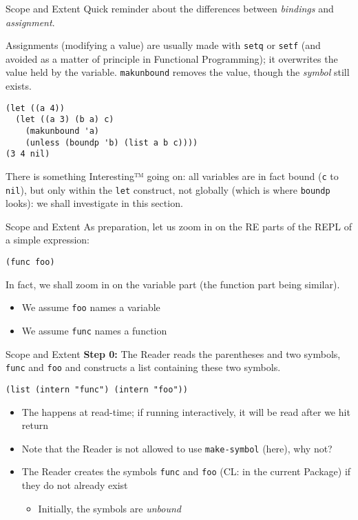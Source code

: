 \documentclass[presentation]{beamer}
\begin{document}
\begin{frame}[fragile]{Scope and Extent}
  Quick reminder about the differences between \emph{bindings} and \emph{assignment}.

  \medskip
  Assignments (modifying a value) are usually made with \texttt{setq} or \texttt{setf} (and avoided as a matter of principle in Functional Programming); it overwrites the value held by the variable.  \texttt{makunbound} removes the value, though the \emph{symbol} still exists.

\begin{verbatim}
(let ((a 4))
  (let ((a 3) (b a) c)
    (makunbound 'a)
    (unless (boundp 'b) (list a b c))))
(3 4 nil)
\end{verbatim}

There is something Interesting™ going on: all variables are in fact bound (\texttt{c} to \texttt{nil}), but only within the \texttt{let} construct, not globally (which is where \texttt{boundp} looks): we shall investigate in this section.

\end{frame}

\begin{frame}[fragile]{Scope and Extent}
  As preparation, let us zoom in on the RE parts of the REPL of a simple expression:
\begin{verbatim}
(func foo)
\end{verbatim}
In fact, we shall zoom in on the variable part (the function part being similar).
\begin{itemize}
\item We assume \texttt{foo} names a variable
\item We assume \texttt{func} names a function
\end{itemize}
\end{frame}

\begin{frame}[fragile]{Scope and Extent}
\textbf{Step 0:} The Reader reads the parentheses and two symbols, \texttt{func} and \texttt{foo} and constructs a list containing these two symbols.
\begin{verbatim}
(list (intern "func") (intern "foo"))
\end{verbatim}
\begin{itemize}
\item The happens at read-time; if running interactively, it will be read after we hit return
\item Note that the Reader is not allowed to use \texttt{make-symbol} (here), why not?
\item The Reader creates the symbols \texttt{func} and \texttt{foo} (CL: in the current Package) if they do not already exist
  \begin{itemize}
  \item Initially, the symbols are \emph{unbound}
  \end{itemize}
\end{itemize}

\end{frame}
\end{document}

